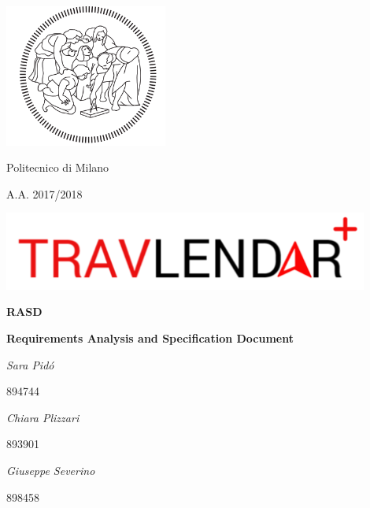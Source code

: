 \documentclass[12pt,titlepage]{article}
\begin{document}
\begin{titlepage}
\centering
\includegraphics[width=0.4\textwidth]{Logos/LogoPolimi}\par
	{{Politecnico di Milano} \par}
	{{A.A. 2017/2018} \par}
	\vspace{1.5cm}
	\includegraphics[width=0.9\textwidth]{Logos/LogoTravlendar}\par
	\vspace{1.5cm}
	{\Huge \textbf {RASD}\par}
	{ \textbf{Requirements Analysis and Specification Document} \par}
	\vspace{1.5cm}
	{\Large\itshape Sara Pid\'o  }{\Large   {  894744}\par}
	{\Large\itshape Chiara Plizzari }{\Large   {  893901}\par}
	{\Large\itshape Giuseppe Severino }{\Large   {  898458}\par}
	\vspace{2cm}
	\vfill
\end{titlepage}

\newpage\null\thispagestyle{empty}\newpage



\end{document}
